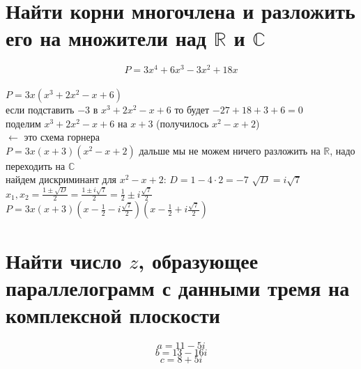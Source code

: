 \documentclass{article}
\newcommand{\ds}{\displaystyle}
\begin{document}
  \section{Найти корни многочлена и разложить его на множители над $\mathbb{R}$ и $\mathbb{C}$}
  \[
    P = 3x^4 + 6x^3 - 3x^2 + 18x
  \] \\
  $\ds P = 3x(x^3 + 2x^2 - x + 6)$ \\
  если подставить $-3$ в $x^3 + 2x^2 - x + 6$ то будет $-27 + 18 + 3 + 6 = 0$ \\
  поделим $x^3 + 2x^2 - x + 6$ на $x+3$ (получилось $x^2-x+2$) \\
   \qquad $\leftarrow$ это схема горнера\\
  $\ds P = 3x(x+3)(x^2-x+2)$ дальше мы не можем ничего разложить на $\mathbb{R}$, надо переходить на $\mathbb{C}$ \\
  найдем дискриминант для $x^2-x+2$: \quad $\ds D = 1-4 \cdot 2 = -7$ \quad $\sqrt{D} = i\sqrt{7}$ \\
  $\ds x_1,x_2 = \frac{1\pm\sqrt{D}}{2} = \frac{1\pm i\sqrt{7}}{2} = \frac{1}{2}\pm i\frac{\sqrt{7}}{2}$ \\
  $\ds P = 3x(x+3)
    \left(x-\frac{1}{2}-i\frac{\sqrt{7}}{2}\right)
    \left(x-\frac{1}{2}+i\frac{\sqrt{7}}{2}\right)
  $

  \section{Найти число $z$, образующее параллелограмм с данными тремя на комплексной плоскости}
  $$ a = 11-5i $$
  $$ b = 13-16i $$
  $$ c = 8+5i $$
  \begin{figure}
    \vspace{-2.5cm}
    \centering
    \vspace{-.5cm}
  \end{figure}
\end{document}
